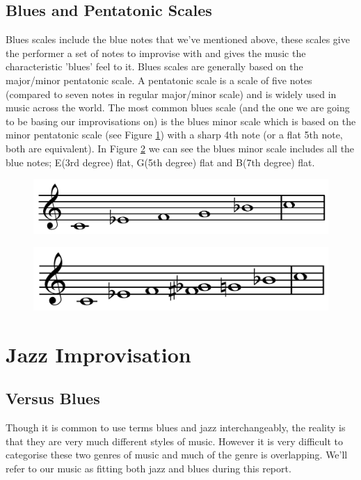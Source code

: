 \documentclass[pdftex,12pt,a4paper]{report}
\begin{document}
\subsection{Blues and Pentatonic Scales}
Blues scales include the blue notes that we've mentioned above, these scales give the performer a set of notes to improvise with and gives the music the characteristic 'blues' feel to it. Blues scales are generally based on the major/minor pentatonic scale. A pentatonic scale is a scale of five notes (compared to seven notes in regular major/minor scale) and is widely used in music across the world. The most common blues scale (and the one we are going to be basing our improvisations on) is the blues minor scale which is based on the minor pentatonic scale (see Figure \ref{fig:cminorpentatonicscale}) with a sharp 4th note (or a flat 5th note, both are equivalent). In Figure \ref{fig:cminorbluesscale} we can see the blues minor scale includes all the blue notes; E(3rd degree) flat, G(5th degree) flat and B(7th degree) flat.

\begin{figure}[here]
  \centering
  \includegraphics[scale=0.25]{figure/minorpentatonicscale.png}
  \label{fig:cminorpentatonicscale}
\end{figure}

\begin{figure}[here]
  \centering
  \includegraphics[scale=0.25]{figure/bluesminorhexatonicscale.png}
  \label{fig:cminorbluesscale}
\end{figure}

\section{Jazz Improvisation}

\subsection{Versus Blues}
Though it is common to use terms blues and jazz interchangeably, the reality is that they are very much different styles of music. However it is very difficult to categorise these two genres of music and much of the genre is overlapping. We'll refer to our music as fitting both jazz and blues during this report.
\end{document}
